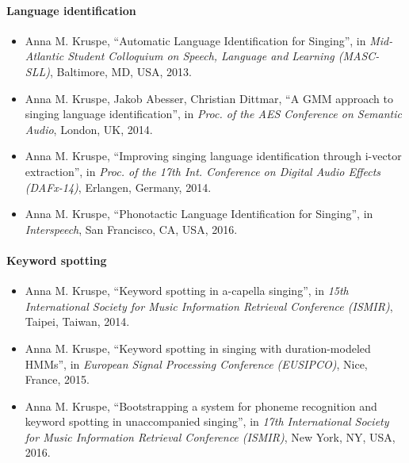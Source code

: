 \paragraph{Language identification}
\begin{itemize}
\item Anna M. Kruspe, ``Automatic Language Identification for Singing'', in \textit{Mid-Atlantic Student Colloquium on Speech, Language and Learning (MASC-SLL)}, Baltimore, MD, USA, 2013.
\item Anna M. Kruspe, Jakob Abesser, Christian Dittmar, ``A GMM approach to singing language identification'', in \textit{Proc. of the AES Conference on Semantic Audio}, London, UK, 2014.
\item Anna M. Kruspe, ``Improving singing language identification through i-vector extraction'', in \textit{Proc. of the 17th Int. Conference on Digital Audio Effects (DAFx-14)}, Erlangen, Germany, 2014.
\item Anna M. Kruspe, ``Phonotactic Language Identification for Singing'', in \textit{Interspeech}, San Francisco, CA, USA, 2016.
\end{itemize}

\paragraph{Keyword spotting}
\begin{itemize}
\item Anna M. Kruspe, ``Keyword spotting in a-capella singing'', in \textit{15th International Society for Music Information Retrieval Conference (ISMIR)}, Taipei, Taiwan, 2014.
\item Anna M. Kruspe, ``Keyword spotting in singing with duration-modeled HMMs'', in \textit{European Signal Processing Conference (EUSIPCO)}, Nice, France, 2015.
\item Anna M. Kruspe, ``Bootstrapping a system for phoneme recognition and keyword spotting in unaccompanied singing'', in \textit{17th International Society for Music Information Retrieval Conference (ISMIR)}, New York, NY, USA, 2016.
\end{itemize}


